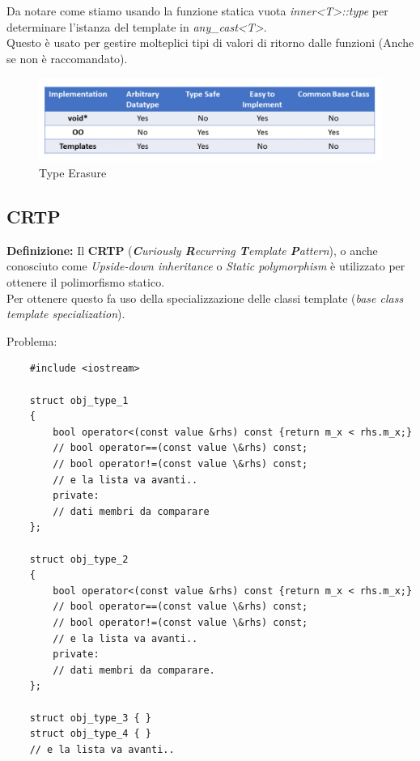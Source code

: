 \textsf{\small Da notare come stiamo usando la funzione statica vuota \emph{inner<T>::type} per determinare l'istanza del template in \emph{any\_cast<T>}.} \\

\textsf{\small Questo è usato per gestire molteplici tipi di valori di ritorno dalle funzioni (Anche se non è raccomandato).} \\

\begin{figure}[H]
	\centering
	\includegraphics[width=1\textwidth, height=1\textheight, keepaspectratio]{./imgs/type_erasure.png}
	\caption{Type Erasure}
	\label{fig:type_erasure}
\end{figure}

\subsection{CRTP}

\textsf{\small \textbf{Definizione: } Il \textbf{CRTP} (\emph{\textbf{C}uriously \textbf{R}ecurring \textbf{T}emplate \textbf{P}attern}), o anche conosciuto come \emph{Upside-down inheritance} o \emph{Static polymorphism} è utilizzato per ottenere il polimorfismo statico.} \\

\textsf{\small Per ottenere questo fa uso della specializzazione delle classi template (\emph{base class template specialization}).} \break

\textsf{\small Problema: } \\

\begin{lstlisting}
	#include <iostream>
	
	struct obj_type_1
	{
		bool operator<(const value &rhs) const {return m_x < rhs.m_x;}
		// bool operator==(const value \&rhs) const;
		// bool operator!=(const value \&rhs) const;    
		// e la lista va avanti..
		private:
		// dati membri da comparare
	};
	
	struct obj_type_2
	{
		bool operator<(const value &rhs) const {return m_x < rhs.m_x;}
		// bool operator==(const value \&rhs) const;
		// bool operator!=(const value \&rhs) const;    
		// e la lista va avanti..
		private:
		// dati membri da comparare.
	};
	
	struct obj_type_3 { }
	struct obj_type_4 { }
	// e la lista va avanti..
\end{lstlisting}


